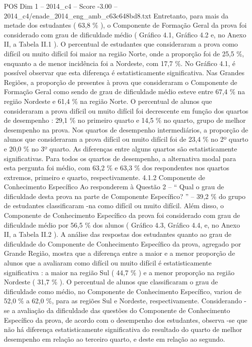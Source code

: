 \begin{textsample}{POS Dim 1 – 2014\_c4 – Score -3.00 – 2014\_c4/enade\_2014\_eng\_amb\_c63c648bd8.txt}
Entretanto, para mais da metade dos estudantes ( 63,8 \% ), o Componente de Formação Geral da prova foi considerado com grau de dificuldade médio ( Gráfico 4.1, Gráfico 4.2 e, no Anexo II, a Tabela II.1 ).
O percentual de estudantes que consideraram a prova como difícil ou muito difícil foi maior na região Norte, onde a proporção foi de 25,5 \%, enquanto a de menor incidência foi a Nordeste, com 17,7 \%.
No Gráfico 4.1, é possível observar que esta diferença é estatisticamente significativa.
Nas Grandes Regiões, a proporção de presentes à prova que consideraram o Componente de Formação Geral como sendo de grau de dificuldade médio esteve entre 67,4 \% na região Nordeste e 61,4 \% na região Norte.
O percentual de alunos que consideraram a prova difícil ou muito difícil foi decrescente em função dos quartos de desempenho : 29,1 \% no primeiro quarto e 14,5 \% no quarto, grupo de melhor desempenho na prova.
Nos quartos de desempenho intermediários, a proporção de alunos que consideraram a prova difícil ou muito difícil foi de 23,4 \% no 2º quarto e 20,0 \% no 3º quarto.
As diferenças entre alguns quartos são estatisticamente significativas.
Para todos os quartos de desempenho, a alternativa modal para esta pergunta foi médio, com 63,2 \% e 63,3 \% dos respondentes nos quartos extremos, primeiro e quarto, respectivamente. 4.1.2 Componente de Conhecimento Específico Ao responderem à Questão 2 – “ Qual o grau de dificuldade desta prova na parte de Componente Específico? ” – 39,2 \% do grupo de estudantes classificaram -na como difícil ou muito difícil.
Além disso, o Componente de Conhecimento Específico da prova foi considerado com grau de dificuldade médio por 56,5 \% dos alunos ( Gráfico 4.3, Gráfico 4.4, e, no Anexo II, a Tabela II.2 ).
A análise das respostas dos estudantes quanto ao grau de dificuldade do Componente de Conhecimento Específico da prova, agregado por Grande Região, mostra que a diferença entre a maior e a menor proporção de alunos que a avaliaram como difícil ou muito difícil é estatisticamente significativa : a maior na região Sul ( 44,7 \% ) e a menor proporção na região Nordeste ( 31,7 \% ).
O percentual de alunos que classificaram o grau de dificuldade como médio, no Componente de Conhecimento Específico, variou de 52,0 \% a 62,0 \%, para as regiões Sul e Nordeste, respectivamente.
Considerando -se a avaliação da dificuldade das questões do Componente de Conhecimento Específico da prova, de acordo com o desempenho dos estudantes, observa -se que não há diferença estatisticamente significativa do resultado do quarto de melhor desempenho em relação ao terceiro quarto, e deste em relação ao segundo.

\end{textsample}
